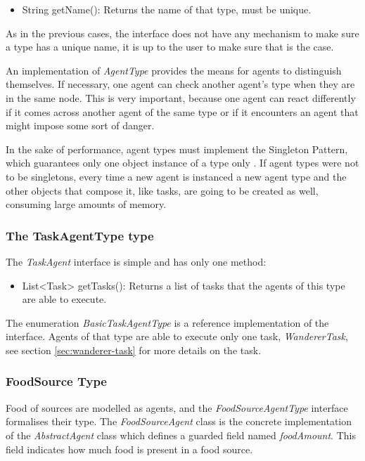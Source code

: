 \begin{itemize}
  \item String getName(): Returns the name of that type, must be unique.
\end{itemize}

As in the previous cases, the interface does not have any mechanism to make sure a type has a unique name, it is up to the user to make sure that is the case.

An implementation of \emph{AgentType} provides the means for agents to distinguish themselves. If necessary, one agent can check another agent’s type when they are in the same node. This is very important, because one agent can react differently if it comes across another agent of the same type or if it encounters an agent that might impose some sort of danger.

In the sake of performance, agent types must implement the Singleton Pattern, which guarantees only one object instance of a type only \cite{bloch2008effective}. If agent types were not to be singletons, every time a new agent is instanced a new agent type and the other objects that compose it, like tasks, are going to be created as well, consuming large amounts of memory. 

\subsubsection{The TaskAgentType type}
\label{sec:taskagentype}

The \emph{TaskAgent} interface is simple and has only one method:

\begin{itemize}
  \item List<Task> getTasks(): Returns a list of tasks that the agents of this type are able to execute.
\end{itemize}

The enumeration \emph{BasicTaskAgentType} is a reference implementation of the interface. Agents of that type are able to execute only one task, \emph{WandererTask}, see section \ref{sec:wanderer-task} for more details on the task.

\subsubsection{FoodSource Type}

Food of sources are modelled as agents, and the \emph{FoodSourceAgentType} interface formalises their type. The \emph{FoodSourceAgent} class is the concrete implementation of the \emph{AbstractAgent} class which defines a guarded field named \emph{foodAmount}. This field indicates how much food is present in a food source.

